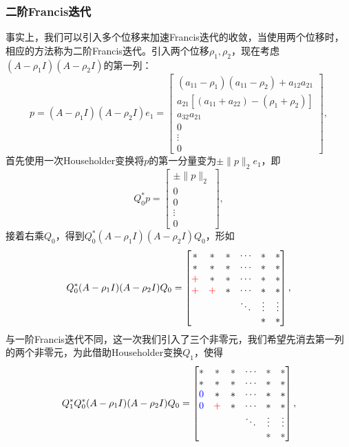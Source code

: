 \documentclass[a4paper,10pt]{ctexart}
\begin{document}
\subsubsection{二阶Francis迭代}
事实上，我们可以引入多个位移来加速Francis迭代的收敛，当使用两个位移时，相应的方法称为二阶Francis迭代。引入两个位移$ \rho_1,\rho_2 $，现在考虑$ (A-\rho_1 I)(A-\rho_2 I) $的第一列：
\[
    p = (A-\rho_1 I)(A-\rho_2 I)e_1 = \begin{bmatrix} 
        (a_{11}-\rho_{1})(a_{11}-\rho_2) + a_{12}a_{21} \\ a_{21}[(a_{11}+a_{22})-(\rho_1+\rho_2)] \\ a_{32}a_{21} \\ 0 \\ \vdots \\ 0
    \end{bmatrix},
\]
首先使用一次Householder变换将$ p $的第一分量变为$ \pm \| p \|_2e_1 $，即
\[
    Q_0^*p = \begin{bmatrix} 
        \pm \| p \|_2 \\ 0 \\ 0 \\ \vdots \\ 0
    \end{bmatrix},
\]
接着右乘$ Q_0 $，得到$ Q_0^*(A-\rho_1 I)(A-\rho_2 I)Q_0 $，形如
\[
    Q_0^*(A-\rho_1 I)(A-\rho_2 I)Q_0 = 
    \begin{bmatrix} 
        * & * & * & \cdots & * & * \\
        * & * & * & \cdots & * & * \\
        \textcolor{red}{+} & * & * & \cdots & * & * \\
        \textcolor{red}{+}  & \textcolor{red}{+}  & * & \cdots & * & * \\
            &   &   & \ddots & \vdots & \vdots \\
            &   &   &        & * & *
    \end{bmatrix},
\]
与一阶Francis迭代不同，这一次我们引入了三个非零元，我们希望先消去第一列的两个非零元，为此借助Householder变换$ Q_1 $，使得
\[
    Q_1^*Q_0^*(A-\rho_1 I)(A-\rho_2 I)Q_0 = 
    \begin{bmatrix} 
        * & * & * & \cdots & * & * \\
        * & * & * & \cdots & * & * \\
        \textcolor{blue}{0} & * & * & \cdots & * & * \\
        \textcolor{blue}{0}  & \textcolor{red}{+}  & * & \cdots & * & * \\
            &   &   & \ddots & \vdots & \vdots \\
            &   &   &        & * & *
    \end{bmatrix},
\]
\end{document}
